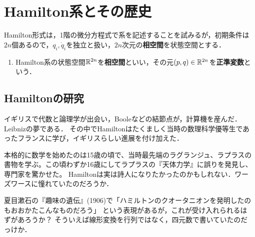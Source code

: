 \documentclass[uplatex, dvipdfmx]{jsreport}
\begin{document}
\section{Hamilton系とその歴史}

\begin{tcolorbox}[colframe=ForestGreen, colback=ForestGreen!10!white,breakable,colbacktitle=ForestGreen!40!white,coltitle=black,fonttitle=\bfseries\sffamily,
title=]
    Hamilton形式は，1階の微分方程式で系を記述することを試みるが，初期条件は$2n$個あるので，$q_i,\dot{q}_i$を独立と扱い，$2n$次元の\textbf{相空間}を状態空間とする．
\end{tcolorbox}

\begin{definition}\mbox{}
    \begin{enumerate}
        \item Hamilton系の状態空間$\mathbb{R}^{2n}$を\textbf{相空間}といい，その元$(p,q)\in\mathbb{R}^{2n}$を\textbf{正準変数}という．
    \end{enumerate}
\end{definition}


\subsection{Hamiltonの研究}

\begin{tcolorbox}[colframe=ForestGreen, colback=ForestGreen!10!white,breakable,colbacktitle=ForestGreen!40!white,coltitle=black,fonttitle=\bfseries\sffamily,
title=]
    
\end{tcolorbox}

\begin{history}
    イギリスで代数と論理学が出会い，Booleなどの結節点が，計算機を産んだ．Leibnizの夢である．
    その中でHamiltonはたくましく当時の数理科学優等生であったフランスに学び，イギリスらしい進展を付け加えた．

    本格的に数学を始めたのは15歳の頃で、当時最先端のラグランジュ、ラプラスの書物を学ぶ。この頃わずか16歳にしてラプラスの『天体力学』に誤りを発見し、専門家を驚かせた。
    Hamiltonは実は詩人になりたかったのかもしれない．ワーズワースに憧れていたのだろうか．
\end{history}
\begin{remark}
    夏目漱石の『趣味の遺伝』(1906)で「ハミルトンのクオータニオンを発明したのもおおかたこんなものだろう」
という表現があるが，これが受け入れられるはずがあろうか？
そういえば線形変換を行列ではなく，四元数で書いていたのだっけか．
\end{remark}
\end{document}

